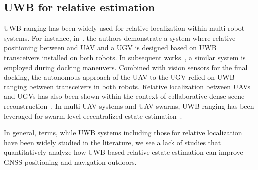 \subsection{UWB for relative estimation}

UWB ranging has been widely used for relative localization within multi-robot systems. For instance, in~\cite{nguyen2018robust}, the authors demonstrate a system where relative positioning between and UAV and a UGV is designed based on UWB transceivers installed on both robots. In subsequent works~\cite{nguyen2019integrated}, a similar system is employed during docking maneuvers. Combined with vision sensors for the final docking, the autonomous approach of the UAV to the UGV relied on UWB ranging between transceivers in both robots. Relative localization between UAVs and UGVs has also been shown within the context of collaborative dense scene reconstruction~\cite{queralta2020vio}. In multi-UAV systems and UAV swarms, UWB ranging has been leveraged for swarm-level decentralized estate estimation~\cite{xu2020decentralized, qi2020cooperative}.

In general, terms, while UWB systems including those for relative localization have been widely studied in the literature, we see a lack of studies that quantitatively analyze how UWB-based relative estate estimation can improve GNSS positioning and navigation outdoors.  





 